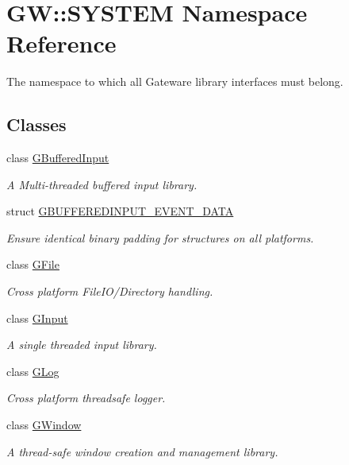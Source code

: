 \hypertarget{namespaceGW_1_1SYSTEM}{}\section{GW\+:\+:S\+Y\+S\+T\+EM Namespace Reference}
\label{namespaceGW_1_1SYSTEM}


The namespace to which all Gateware library interfaces must belong.  


\subsection*{Classes}
\begin{DoxyCompactItemize}
\item 
class \hyperlink{classGW_1_1SYSTEM_1_1GBufferedInput}{G\+Buffered\+Input}
\begin{DoxyCompactList}\small\item\em A Multi-\/threaded buffered input library. \end{DoxyCompactList}\item 
struct \hyperlink{structGW_1_1SYSTEM_1_1GBUFFEREDINPUT__EVENT__DATA}{G\+B\+U\+F\+F\+E\+R\+E\+D\+I\+N\+P\+U\+T\+\_\+\+E\+V\+E\+N\+T\+\_\+\+D\+A\+TA}
\begin{DoxyCompactList}\small\item\em Ensure identical binary padding for structures on all platforms. \end{DoxyCompactList}\item 
class \hyperlink{classGW_1_1SYSTEM_1_1GFile}{G\+File}
\begin{DoxyCompactList}\small\item\em Cross platform File\+I\+O/\+Directory handling. \end{DoxyCompactList}\item 
class \hyperlink{classGW_1_1SYSTEM_1_1GInput}{G\+Input}
\begin{DoxyCompactList}\small\item\em A single threaded input library. \end{DoxyCompactList}\item 
class \hyperlink{classGW_1_1SYSTEM_1_1GLog}{G\+Log}
\begin{DoxyCompactList}\small\item\em Cross platform threadsafe logger. \end{DoxyCompactList}\item 
class \hyperlink{classGW_1_1SYSTEM_1_1GWindow}{G\+Window}
\begin{DoxyCompactList}\small\item\em A thread-\/safe window creation and management library. \end{DoxyCompactList}\item 

\end{DoxyCompactItemize}
